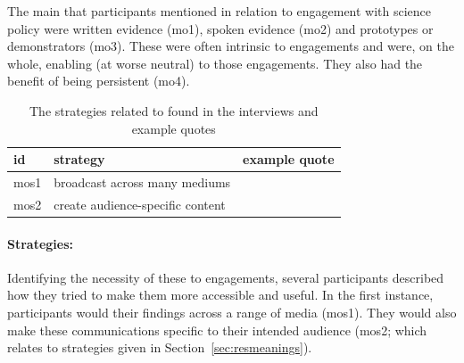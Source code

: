 The main \ismmo{} that participants mentioned in relation to engagement with science policy were written evidence (mo1), spoken evidence (mo2) and prototypes or demonstrators (mo3). These \ismmo{} were often intrinsic to engagements and were, on the whole, enabling (at worse neutral) to those engagements. They also had the benefit of being persistent (mo4).

\begin{table}[!ht]
\footnotesize
\caption{The strategies related to \ismmo{} found in the interviews and example quotes}\label{tab:resobjectsstrat}
\begin{tabular}{L{.06\linewidth}L{.3\linewidth}L{.64\linewidth}} \hline
\textbf{id} & \textbf{strategy} & \textbf{example quote} \\ \hline \hline
mos1 & broadcast across many mediums &  \vfill {} \\[5mm]
mos2 & create audience-specific content &  \vfill {} \\[5mm]
 \hline
 \end{tabular}
\end{table}

\paragraph{Strategies:}
Identifying the necessity of these \ismmo{} to engagements, several participants described how they tried to make them more accessible and useful. In the first instance, participants would  their findings across a range of media (mos1). They would also make these communications specific to their intended audience (mos2; which relates to strategies given in Section~\ref{sec:resmeanings}).

\subsubsection{\ismmts}\label{sec:restimes}


